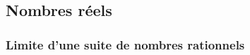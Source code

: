 %
%
%
%
%
%
%    
%
%
%
%
%
%
%
%
%
%

\subsection{Nombres réels}

\subsubsection{Limite d'une suite de nombres rationnels}

